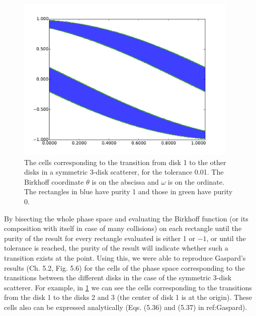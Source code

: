 \documentclass[pre, amsmath, amssymb, onecolumn, showpacs]{revtex4-1}
\begin{document}
\begin{figure}
\centering
\includegraphics*[width=300pt]{birkhoff-12-and-13_tol=1e-2.pdf}
\caption{The cells corresponding to the transition from disk 1 to the other disks in a symmetric 3-disk scatterer, for the tolerance 0.01. The Birkhoff coordinate $\theta$ is on the abscissa and $\omega$ is on the ordinate. The rectangles in blue have purity 1 and those in green have purity 0.}
\label{fig01}
\end{figure}

By bisecting the whole phase space and evaluating the Birkhoff function (or its composition with itself in case of many collisions) on each rectangle until the purity of the result for every rectangle evaluated is either 1 or $-1$, or until the tolerance is reached, the purity of the result will indicate whether such a transition exists at the point. Using this, we were able to reproduce Gaspard's results (Ch. 5.2, Fig. 5.6) for the cells of the phase space corresponding to the transitions between the different disks in the case of the symmetric 3-disk scatterer. For example, in \ref{fig01} we can see the cells corresponding to the transitions from the disk 1 to the disks 2 and 3 (the center of disk 1 is at the origin). These cells also can be expressed analytically (Eqs. (5.36) and (5.37) in ref:Gaspard). 














\vspace*{10pt}


%


\end{document}
